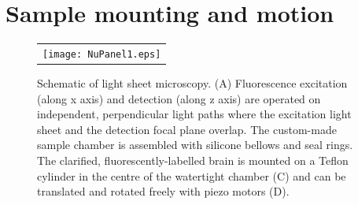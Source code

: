 \documentclass[12pt]{spieman}  %
\begin{document}
\section{Sample mounting and motion}
%
		
\begin{figure}
   \begin{center}
   \begin{tabular}{c}
   \texttt{[image: NuPanel1.eps]}
   \end{tabular}
   \end{center}
   \caption{\label{fig:Panel1} Schematic of light sheet microscopy. (A) Fluorescence excitation (along x axis) and detection (along z axis) are operated on independent, perpendicular light paths where the excitation light sheet and the detection focal plane overlap. The custom-made sample chamber is assembled with silicone bellows and seal rings. The clarified, fluorescently-labelled brain is mounted on a Teflon cylinder in the centre of the watertight chamber (C) and can be translated and rotated freely with piezo motors (D).} 
   \end{figure}		
		
\end{document}
